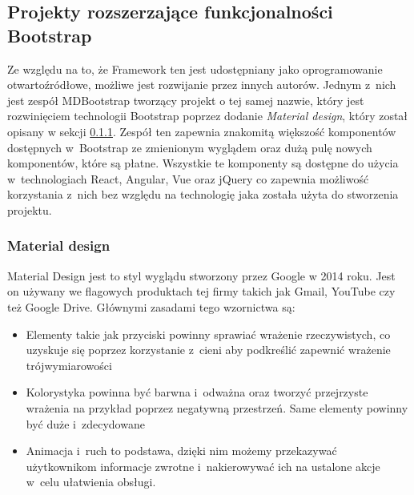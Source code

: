 \documentclass[../Kamil_Kowalewski_Main.tex]{subfiles}
\begin{document}
{{        \subsection{Projekty rozszerzające funkcjonalności Bootstrap}
        \label{chapter3:technologie:bootstrap:mdb} {
            Ze względu na to, że Framework ten jest udostępniany jako oprogramowanie
            otwartoźródłowe, możliwe jest rozwijanie przez innych autorów.
            Jednym z~nich jest zespół
            MDBootstrap tworzący projekt o tej samej nazwie\cite{website:mdbootstrap},
            który jest rozwinięciem technologii Bootstrap poprzez dodanie
            \textit{Material design}, który został opisany w sekcji
            \ref{chapter3:technologie:bootstrap:mdb:material_design}. Zespół ten
            zapewnia znakomitą większość komponentów dostępnych w~Bootstrap ze
            zmienionym wyglądem oraz dużą pulę nowych komponentów, które są płatne.
            Wszystkie te komponenty są dostępne do użycia w~technologiach
            React\cite{website:react}, Angular\cite{website:angular},
            Vue\cite{website:vue} oraz jQuery\cite{website:jquery} co zapewnia
            możliwość korzystania z~nich bez względu na technologię jaka została użyta
            do stworzenia projektu.

            \subsubsection{Material design}
            \label{chapter3:technologie:bootstrap:mdb:material_design} {
                Material Design\cite{website:material_design} jest to styl wyglądu
                stworzony przez Google w 2014 roku. Jest on używany we flagowych
                produktach tej firmy takich jak Gmail, YouTube czy też Google Drive.
                Głównymi zasadami tego wzornictwa są:
                \begin{itemize}
                    \item Elementy takie jak przyciski powinny sprawiać wrażenie
                    rzeczywistych, co uzyskuje się poprzez korzystanie z~cieni aby
                    podkreślić zapewnić wrażenie trójwymiarowości
                    \item Kolorystyka powinna być barwna i~odważna oraz tworzyć
                    przejrzyste wrażenia na przykład poprzez negatywną przestrzeń. Same
                    elementy powinny być duże i~zdecydowane
                    \item Animacja i~ruch to podstawa, dzięki nim możemy przekazywać
                    użytkownikom informacje zwrotne i~nakierowywać ich na ustalone akcje
                    w~celu ułatwienia obsługi.
                \end{itemize}

}}}}
\end{document}
